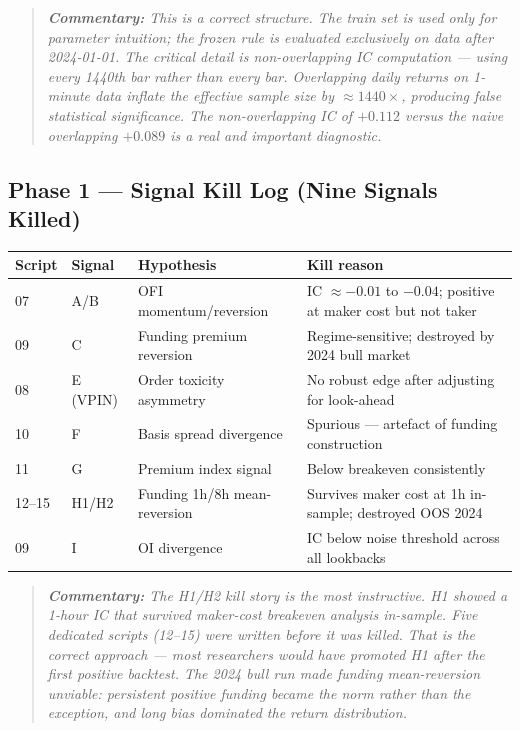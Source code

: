 \documentclass[11pt,a4paper]{article}
\newcommand{\comment}[1]{%
  \begin{quote}
    \small\itshape\textbf{Commentary:} #1
  \end{quote}
}
\begin{document}
\comment{This is a correct structure. The train set is used only for parameter intuition; the frozen rule is evaluated exclusively on data after 2024-01-01. The critical detail is \emph{non-overlapping} IC computation --- using every 1440th bar rather than every bar. Overlapping daily returns on 1-minute data inflate the effective sample size by $\approx 1440\times$, producing false statistical significance. The non-overlapping IC of $+0.112$ versus the naive overlapping $+0.089$ is a real and important diagnostic.}

\subsection{Phase 1 --- Signal Kill Log (Nine Signals Killed)}

\begin{longtable}{@{}lllp{6.5cm}@{}}
\toprule
\textbf{Script} & \textbf{Signal} & \textbf{Hypothesis} & \textbf{Kill reason} \\
\midrule
\endhead
07 & A/B & OFI momentum/reversion & IC $\approx -0.01$ to $-0.04$; positive at maker cost but not taker \\[4pt]
09 & C & Funding premium reversion & Regime-sensitive; destroyed by 2024 bull market \\[4pt]
08 & E (VPIN) & Order toxicity asymmetry & No robust edge after adjusting for look-ahead \\[4pt]
10 & F & Basis spread divergence & Spurious --- artefact of funding construction \\[4pt]
11 & G & Premium index signal & Below breakeven consistently \\[4pt]
12--15 & H1/H2 & Funding 1h/8h mean-reversion & Survives maker cost at 1h in-sample; destroyed OOS 2024 \\[4pt]
09 & I & OI divergence & IC below noise threshold across all lookbacks \\
\bottomrule
\end{longtable}

\comment{The H1/H2 kill story is the most instructive. H1 showed a 1-hour IC that survived maker-cost breakeven analysis in-sample. Five dedicated scripts (12--15) were written before it was killed. That is the correct approach --- most researchers would have promoted H1 after the first positive backtest. The 2024 bull run made funding mean-reversion unviable: persistent positive funding became the norm rather than the exception, and long bias dominated the return distribution.}
\end{document}
